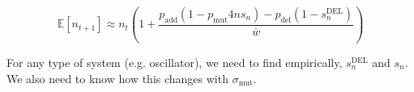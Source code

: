 \documentclass{article}
\begin{document}
\begin{equation}
\mathbb{E} \left[ n_{t+1} \right] \approx n_t \left( 1 + \frac{p_{\text{add}} \left(1 - p_{\text{mut}}4ns_n\right) - p_{\text{del}} \left(1 - s^{\text{DEL}}_{n}\right)}{\bar{w}} \right)
\end{equation}

For any type of system (e.g. oscillator), we need to find empirically, $s^{\text{DEL}}_n$ and $s_n$. We also need to know how this changes with $\sigma_{\text{mut}}$. 
\end{document}
